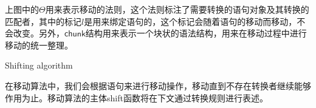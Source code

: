 上图中的$\Theta$用来表示移动的法则，这个法则标注了需要转换的语句对象及其转换的匹配者，其中的标记$l$是用来绑定语句的，这个标记会随着语句的移动而移动，不会改变。另外，$\mathsf{chunk}$结构用来表示一个块状的语法结构，用来在移动过程中进行移动的统一整理。

\begin{algorithm}[H]
\caption{Shifting algorithm}
\end{algorithm}

在移动算法中，我们会根据语句来进行移动操作，移动直到不存在转换者继续能够作用为止。移动算法的主体shift函数将在下文通过转换规则进行表述。

\newcommand{\ifelse}[3]{\mathtt{if}({#1})\{#2\}\mathtt{else}\{{#3}\}}
\newcommand{\chunk}{\mathsf{chunk}}
\newcommand{\twolines}[2]{\mbox{\stackanchor{{#1}}{~~~~~~~~~~~~~~{#2}}}}
\newcommand{\tcol}[2]{\begin{parcolumns}[nofirstindent]{2}\colchunk[1]{#1}\colchunk[2]{#2}\colplacechunks\end{parcolumns}}
\newcommand{\lf}{\lfloor}
\newcommand{\rf}{\rfloor}

